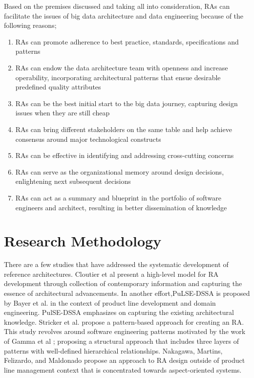 \documentclass[review]{elsarticle}
\begin{document}
Based on the premises discussed and taking all into consideration, RAs can facilitate the issues of big data architecture and data engineering because of the following reasons;

\begin{enumerate}
    \item RAs can promote adherence to best practice, standards, specifications and patterns
    \item RAs can endow the data architecture team with openness and increase operability, incorporating architectural patterns that ensue desirable predefined quality attributes
    \item RAs can be the best initial start to the big data journey, capturing design issues when they are still cheap
    \item RAs can bring different stakeholders on the same table and help achieve consensus around major technological constructs
    \item RAs can be effective in identifying and addressing cross-cutting concerns
    \item RAs can serve as the organizational memory around design decisions, enlightening next subsequent decisions 
    \item RAs can act as a summary and blueprint in the portfolio of software engineers and architect, resulting in better dissemination of knowledge
\end{enumerate}

\section{Research Methodology}

There are a few studies that have addressed the systematic development of reference architectures. Cloutier et al \cite{Cloutier} present a high-level model for RA development through collection of contemporary information and capturing the essence of architectural advancements. In another effort,PuLSE-DSSA is proposed by Bayer et al. \cite{bayer2004definition} in the context of product line development and domain engineering. PulSE-DSSA emphasizes on capturing the existing architectural knowledge. Stricker et al. \cite{stricker2010creating} propose a pattern-based approach for creating an RA. This study revolves around software engineering patterns motivated by the work of Gamma et al  \cite{gamma1995design}; proposing a structural approach that includes three layers of patterns with well-defined hierarchical relationships. Nakagawa, Martins, Felizardo, and Maldonado \cite{nakagawa2009towards} propose an approach to RA design outside of product line management context that is concentrated towards aspect-oriented systems. 
\end{document}
